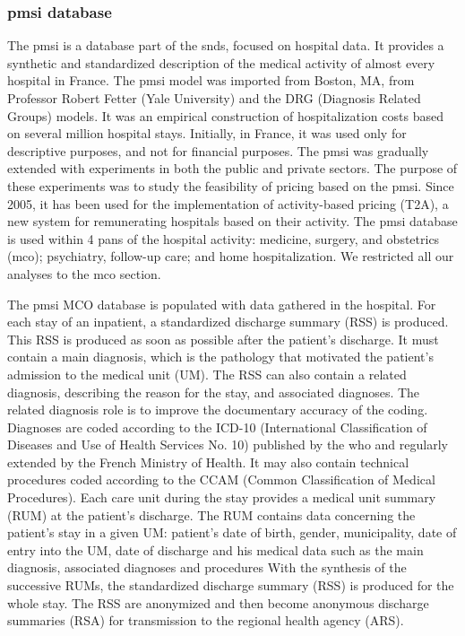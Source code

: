\subsubsection{\acs{pmsi} database}

The \acf{pmsi} is a database part of the \ac{snds}, focused on hospital data. It
provides a synthetic and standardized description of the medical activity of
almost every hospital in France. The \ac{pmsi} model was imported from Boston,
MA, from Professor Robert Fetter (Yale University) and the DRG (Diagnosis
Related Groups) models. It was an empirical construction of hospitalization
costs based on several million hospital stays. Initially, in France, it was used
only for descriptive purposes, and not for financial purposes. The \ac{pmsi} was
gradually extended with experiments in both the public and private sectors. The
purpose of these experiments was to study the feasibility of pricing based on
the \ac{pmsi}. Since 2005, it has been used for the implementation of
activity-based pricing (T2A), a new system for remunerating hospitals based on
their activity. The \ac{pmsi} database is used within 4 pans of the hospital
activity: medicine, surgery, and obstetrics (\acs{mco}); psychiatry, follow-up
care; and home hospitalization. We restricted all our analyses to the \acs{mco}
section.

The \ac{pmsi} MCO database is populated with data gathered in the
hospital. For each stay of an inpatient, a standardized discharge summary (RSS)
is produced. This RSS is produced as soon as possible after the patient's
discharge. It must contain a main diagnosis, which is the pathology that
motivated the patient's admission to the medical unit (UM). The RSS can also
contain a related diagnosis, describing the reason for the stay, and associated
diagnoses. The related diagnosis role is to improve the documentary accuracy of
the coding. Diagnoses are coded according to the ICD-10 (International
Classification of Diseases and Use of Health Services No. 10) published by the
\ac{who} and regularly extended by the French Ministry of Health. It may also
contain technical procedures coded according to the CCAM (Common Classification
of Medical Procedures). Each care unit during the stay provides a medical unit
summary (RUM) at the patient's discharge. The RUM contains data concerning the
patient's stay in a given UM: patient's date of birth, gender, municipality,
date of entry into the UM, date of discharge and his medical data such as the
main diagnosis, associated diagnoses and procedures With the synthesis of the
successive RUMs, the standardized discharge summary (RSS) is produced for the
whole stay. The RSS are anonymized and then become anonymous discharge summaries
(RSA) for transmission to the regional health agency (ARS).

